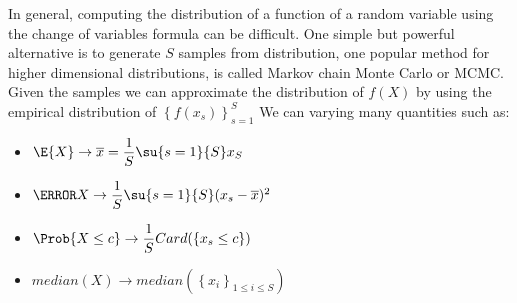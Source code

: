 In general, computing the distribution of a function of a random variable using the change
of variables formula can be difficult. One simple but powerful alternative is to generate 
$S$ samples from distribution, one popular method for higher dimensional distributions, is
called Markov chain Monte Carlo or MCMC.
Given the samples we can approximate the distribution of $f(X)$ by using the empirical 
distribution of $\left\{f(x_{s})\right\}^{S}_{s=1}$
We can varying many quantities such as:
\begin{itemize}
	\item $\E{X} \rightarrow \overline{x} = \dfrac{1}{S}\su{{s=1}}{S}x_{S}$ 
	\item $\V{X} \rightarrow \dfrac{1}{S}\su{{s=1}}{S}(x_{s}-\overline{x})^{2}$
	\item $\Prob{X\leq c} \rightarrow \dfrac{1}{S}Card(\left\{x_{s}\leq c\right\})$
	\item $ median(X) \rightarrow median(\left\{x_{i}\right\}_{1\leq i\leq S})$
\end{itemize}
